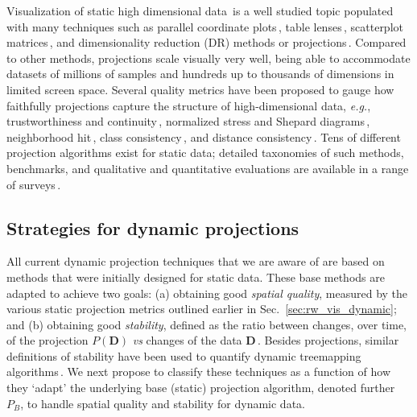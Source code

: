 Visualization of static high dimensional data\,\citep{Liu2017} is a well studied topic populated with many techniques such as parallel coordinate plots\,\citep{Inselberg1990}, table lenses\,\citep{Rao2003}, scatterplot matrices\,\citep{Becker1996}, and dimensionality reduction (DR) methods or projections\,\citep{vanderMaaten2009}. Compared to other methods, projections scale visually very well, being able to accommodate datasets of millions of samples and hundreds up to thousands of dimensions in limited screen space. Several quality metrics have been proposed to gauge how faithfully projections capture the structure of high-dimensional data, \emph{e.g.}, trustworthiness and continuity\,\citep{venna06}, normalized stress and Shepard diagrams\,\citep{Joia2011}, neighborhood hit\,\citep{Paulovich2008}, class consistency\,\citep{tatu10}, and distance consistency\,\citep{sips09}. Tens of different projection algorithms exist for static data; detailed taxonomies of such methods, benchmarks, and qualitative and quantitative evaluations are available in a range of surveys\,\citep{Nonato2019,Espadoto19,fodor02_survey,cunningham15_survey,sorzano14_survey,vanderMaaten2009}.


\subsection{Strategies for dynamic projections} 
\label{sec:taxonomy}
%
All current dynamic projection techniques that we are aware of are based on methods that were initially designed for static data. These base methods are adapted to achieve two goals: (a) obtaining good \emph{spatial quality}, measured by the various static projection metrics outlined earlier in Sec.~\ref{sec:rw_vis_dynamic}; and (b) obtaining good \emph{stability}, defined as the ratio between changes, over time, of the projection $P(\mathbf{D})$ \emph{vs} changes of the data $\mathbf{D}$\,\citep{Vernier2020}. Besides projections, similar definitions of stability have been used to quantify dynamic treemapping algorithms\,\citep{vernier_treemap,vernier18software}.  We next propose to classify these techniques as a function of how they `adapt' the underlying base (static) projection algorithm, denoted further $P_B$, to handle spatial quality and stability for dynamic data.\\

